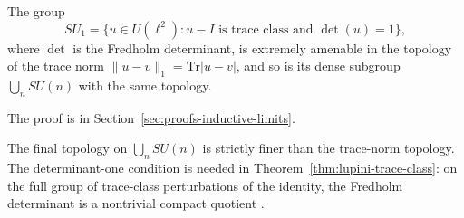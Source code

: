 \begin{theorem}\label{thm:lupini-trace-class}
The group
\[
SU_1=\{u\in U(\ell^2) : u-I \text{ is trace class and } \det(u)=1\},
\]
where $\det$ is the Fredholm determinant, is extremely amenable in the
topology of the trace norm $\|u-v\|_1=\mathrm{Tr}|u-v|$, and so is its dense
subgroup $\bigcup_nSU(n)$ with the same topology.
\end{theorem}

The proof is in Section~\ref{sec:proofs-inductive-limits}.

\begin{remark}\label{rem:lupini-trace-class}
The final topology on $\bigcup_nSU(n)$ is strictly finer than the trace-norm
topology. The determinant-one condition is needed in
Theorem~\ref{thm:lupini-trace-class}: on the full group of trace-class
perturbations of the identity, the Fredholm determinant is a nontrivial
compact quotient \cite{LupiniInductive2026}.
\end{remark}
